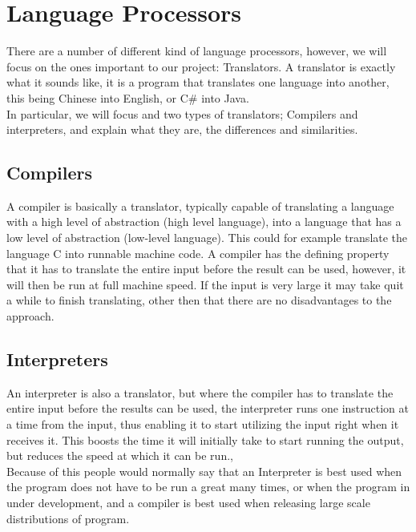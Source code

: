 \chapter{Language Processors}


There are a number of different kind of language processors, however, we will focus on the ones important to our project: Translators. A translator is exactly what it sounds like, it is a program that translates one language into another, this being Chinese into English, or C\# into Java. \\
\indent In particular, we will focus and two types of translators; Compilers and interpreters, and explain what they are, the differences and similarities.

\section{Compilers}
A compiler is basically a translator, typically capable of translating a language with a high level of abstraction (high level language), into a language that has a low level of abstraction (low-level language). This could for example translate the language C into runnable machine code. A compiler has the defining property that it has to translate the entire input before the result can be used, however, it will then be run at full machine speed. If the input is very large it may take quit a while to finish translating, other then that there are no disadvantages to the approach.

\section{Interpreters}
An interpreter is also a translator, but where the compiler has to translate the entire input before the results can be used, the interpreter runs one instruction at a time from the input, thus enabling it to start utilizing the input right when it receives it. This boosts the time it will initially take to start running the output, but reduces the speed at which it can be run.,\\
\indent Because of this people would normally say that an Interpreter is best used when the program does not have to be run a great many times, or when the program in under development, and a compiler is best used when releasing large scale distributions of program.

